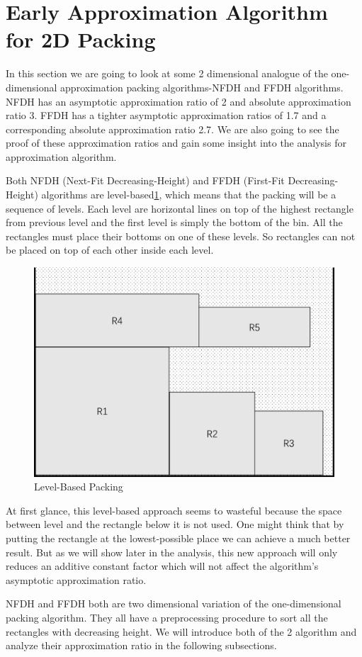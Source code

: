 \documentclass[sigplan,screen,nonacm]{acmart}\settopmatter{printfolios=true,printccs=false,printacmref=false}
\begin{document}
\section{Early Approximation Algorithm for 2D Packing}
In this section we are going to look at some 2 dimensional analogue of the one-dimensional approximation packing algorithms\cite{johnson1974worst}-NFDH and FFDH algorithms. NFDH has an asymptotic approximation ratio of 2 and absolute approximation ratio 3. FFDH has a tighter asymptotic approximation ratios of 1.7 and a corresponding absolute approximation ratio 2.7. We are also going to see the proof of these approximation ratios and gain some insight into the analysis for approximation algorithm.\par
Both NFDH (Next-Fit Decreasing-Height) and FFDH (First-Fit Decreasing-Height) algorithms are level-based\ref{fig:level-based}, which means that the packing will be a sequence of levels. Each level are horizontal lines on top of the highest rectangle from previous level and the first level is simply the bottom of the bin. All the rectangles must place their bottoms on one of these levels. So rectangles can not be placed on top of each other inside each level.
\begin{figure}[htbp]
  \centering
  \includegraphics[scale=0.4]{levelbased}
  \caption{Level-Based Packing}
  \label{fig:level-based}
\end{figure}
At first glance, this level-based approach seems to wasteful because the space between level and the rectangle below it is not used. One might think that by putting the rectangle at the lowest-possible place we can achieve a much better result. But as we will show later in the analysis, this new approach will only reduces an additive constant factor which will not affect the algorithm's asymptotic approximation ratio.\par
NFDH and FFDH both are two dimensional variation of the one-dimensional packing algorithm\cite{johnson1974worst}. They all have a preprocessing procedure to sort all the rectangles with decreasing height. We will introduce both of the 2 algorithm and analyze their approximation ratio in the following subsections.
\end{document}

